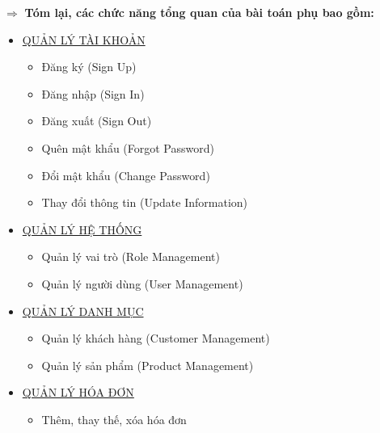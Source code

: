 $\Rightarrow$ \textbf{Tóm lại, các chức năng tổng quan của bài toán phụ bao gồm:}

\begin{itemize}

\item \underline{{QUẢN LÝ TÀI KHOẢN}}

\begin{itemize}

\item Đăng ký (Sign Up)

\item Đăng nhập (Sign In)

\item Đăng xuất (Sign Out)

\item Quên mật khẩu (Forgot Password)

\item Đổi mật khẩu (Change Password)

\item Thay đổi thông tin (Update Information)

\end{itemize}

\item \underline{{QUẢN LÝ HỆ THỐNG}}

\begin{itemize}

\item Quản lý vai trò (Role Management)

\item Quản lý người dùng (User Management)

\end{itemize}

\item \underline{{QUẢN LÝ DANH MỤC}}

\begin{itemize}

\item Quản lý khách hàng (Customer Management)

\item Quản lý sản phẩm (Product Management)

\end{itemize}

\item \underline{{QUẢN LÝ HÓA ĐƠN}}

\begin{itemize}

\item Thêm, thay thế, xóa hóa đơn


\end{itemize}
\end{itemize}
